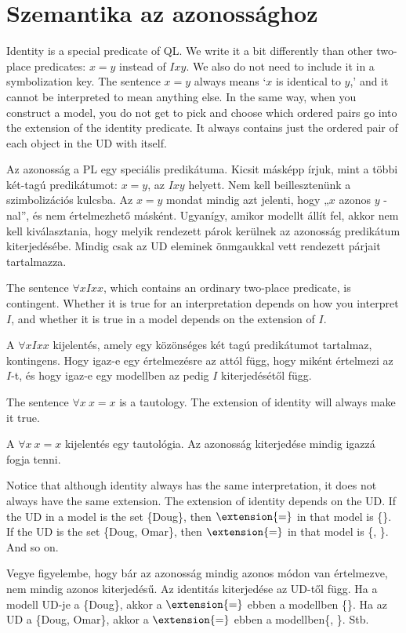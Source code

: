 \section{Szemantika az azonossághoz}
Identity is a special predicate of QL. We write it a bit differently than other two-place predicates: $x=y$ instead of $Ixy$. We also do not need to include it in a symbolization key. The sentence $x=y$ always means `$x$ is identical to $y$,'  and it cannot be interpreted to mean anything else. In the same way, when you construct a model, you do not get to pick and choose which ordered pairs go into the extension of the identity predicate. It always contains just the ordered pair of each object in the UD with itself.

Az azonosság a PL egy speciális predikátuma. Kicsit másképp írjuk, mint a többi két-tagú predikátumot: $ x = y $, az $ Ixy $ helyett. Nem kell beillesztenünk a szimbolizációs kulcsba. Az $ x = y $ mondat mindig azt jelenti, hogy „$ x $ azonos  $ y $ -nal”, és nem értelmezhető másként. Ugyanígy, amikor modellt állít fel, akkor nem kell kiválasztania, hogy melyik rendezett párok kerülnek az azonosság predikátum kiterjedésébe. Mindig csak az UD eleminek önmgaukkal vett rendezett párjait tartalmazza.

The sentence $\forall x Ixx$, which contains an ordinary two-place predicate, is contingent. Whether it is true for an interpretation depends on how you interpret $I$, and whether it is true in a model depends on the extension of $I$.

A $ \forall x Ixx$ kijelentés, amely egy közönséges két tagú predikátumot tartalmaz, kontingens. Hogy igaz-e egy értelmezésre az attól függ, hogy miként értelmezi az $I$-t, és hogy igaz-e egy modellben az pedig $I$ kiterjedésétől függ.

The sentence $\forall x\ x=x$ is a tautology. The extension of identity will always make it true.

A $\forall x\ x=x$ kijelentés egy tautológia. Az azonosság kiterjedése mindig igazzá fogja tenni.

Notice that although identity always has the same interpretation, it does not always have the same extension. The extension of identity depends on the UD. If the UD in a model is the set \{Doug\}, then $\extension{=}$ in that model is \{\}. If the UD is the set \{Doug, Omar\}, then $\extension{=}$ in that model is \{, \}. And so on.

Vegye figyelembe, hogy bár az azonosság mindig azonos módon van értelmezve, nem mindig azonos kiterjedésű. Az identitás kiterjedése az UD-től függ. Ha a modell UD-je a \{Doug\}, akkor a $\extension{=}$ ebben a modellben \{\}. Ha az UD a \{Doug, Omar\}, akkor a $ \extension{=}$ ebben a modellben\{,  \}. Stb.

